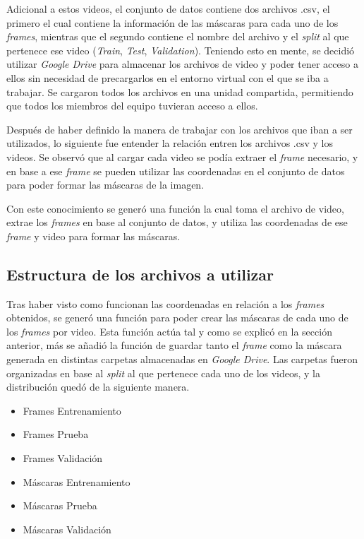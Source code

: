 \documentclass[runningheads]{llncs}
\begin{document}
Adicional a estos videos, el conjunto de datos contiene dos archivos .csv, el primero el cual contiene la información de las máscaras para cada uno de los \textit{frames}, mientras que el segundo contiene el nombre del archivo y el \textit{split} al que pertenece ese video (\textit{Train}, \textit{Test}, \textit{Validation}). Teniendo esto en mente, se decidió utilizar \textit{Google Drive} para almacenar los archivos de video y poder tener acceso a ellos sin necesidad de precargarlos en el entorno virtual con el que se iba a trabajar. Se cargaron todos los archivos en una unidad compartida, permitiendo que todos los miembros del equipo tuvieran acceso a ellos.

Después de haber definido la manera de trabajar con los archivos que iban a ser utilizados, lo siguiente fue entender la relación entren los archivos .csv y los videos. Se observó que al cargar cada video se podía extraer el \textit{frame} necesario, y en base a ese \textit{frame} se pueden utilizar las coordenadas en el conjunto de datos para poder formar las máscaras de la imagen. 

Con este conocimiento se generó una función la cual toma el archivo de video, extrae los \textit{frames} en base al conjunto de datos, y utiliza las coordenadas de ese \textit{frame} y video para formar las máscaras.

\subsection{Estructura de los archivos a utilizar}
Tras haber visto como funcionan las coordenadas en relación a los \textit{frames} obtenidos, se generó una función para poder crear las máscaras de cada uno de los \textit{frames} por video. Esta función actúa tal y como se explicó en la sección anterior, más se añadió la función de guardar tanto el \textit{frame} como la máscara generada en distintas carpetas almacenadas en \textit{Google Drive}. Las carpetas fueron organizadas en base al \textit{split} al que pertenece cada uno de los videos, y la distribución quedó de la siguiente manera.

\begin{itemize}
    \item Frames Entrenamiento
    \item Frames Prueba
    \item Frames Validación
    \item Máscaras Entrenamiento
    \item Máscaras Prueba
    \item Máscaras Validación
\end{itemize}
\end{document}
